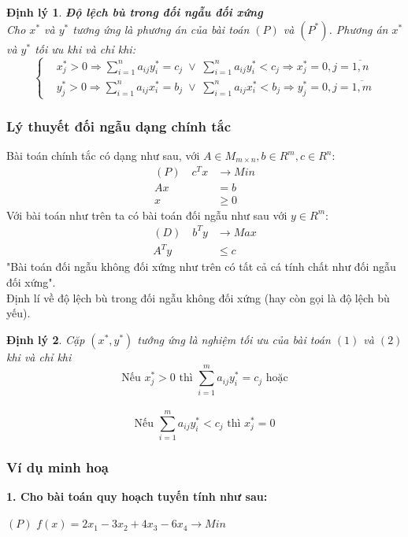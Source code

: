 \documentclass{article}
\newtheorem{dl}{Định lý}
\begin{document}
\begin{dl}{\textbf{Độ lệch bù trong đối ngẫu đối xứng}}\\
    Cho $x^*$ và $y^*$ tương ứng là phương án của bài toán $(P)$ và $(P^*)$. Phương án $x^*$ và $y^*$ tối ưu khi và chỉ khi:
    \[\left\{\begin{aligned}
        & x_j^* > 0 \Longrightarrow \displaystyle\sum\limits_{i=1}^na_{ij}y_i^*=c_j \;\vee\;\displaystyle\sum\limits_{i=1}^na_{ij}y_i^* < c_j\Longrightarrow x_j^* =0,j=\overline{1,n}\\
        & y_j^* > 0 \Longrightarrow \displaystyle\sum\limits_{i=1}^na_{ij}x_i^*=b_j \;\vee\;\displaystyle\sum\limits_{i=1}^na_{ij}x_i^* < b_j\Longrightarrow y_j^* =0,j=\overline{1,m}
    \end{aligned}\right.\]
\end{dl}
\subsubsection{Lý thuyết đối ngẫu dạng chính tắc}
Bài toán chính tắc có dạng như sau, với $A \in M_{m \times n},b \in R^m, c \in R^n$:
\begin{equation}
    \begin{split}
        (P) \quad c^Tx &\rightarrow Min \\
        Ax&=b \\
        x &\geq 0
    \end{split}
\end{equation}
Với bài toán như trên ta có bài toán đối ngẫu như sau với $y \in R^m$:
\begin{equation}
    \begin{split}
        (D) \quad b^Ty &\rightarrow Max \\
        A^Ty &\leq c
    \end{split}
\end{equation}
"Bài toán đối ngẫu không đối xứng như trên có tất cả cá tính chất như đối ngẫu đối xứng". \\
Định lí về độ lệch bù trong đối ngẫu không đối xứng (hay còn gọi là độ lệch bù yếu).
\begin{dl}
Cặp $(x^*,y^*)$ tướng ứng là nghiệm tối ưu của bài toán $(1)$ và $(2)$ khi và chỉ khi
\[\text{Nếu } x_j^* > 0 \text{ thì } \sum_{i=1}^ma_{ij}y_i^*=c_j \text{ hoặc}\] \\
\[\text{Nếu } \sum_{i=1}^ma_{ij}y_i^* < c_j \text{ thì } x_j^*=0\]
\end{dl}
\subsubsection{Ví dụ minh hoạ}
\textbf{1. Cho bài toán quy hoạch tuyến tính như sau:}\\
\begin{center}
$\left(P\right)$ \quad $f(x)=2x_1-3x_2+4x_3-6x_4\longrightarrow Min$\\
\end{center}\\
\end{document}
